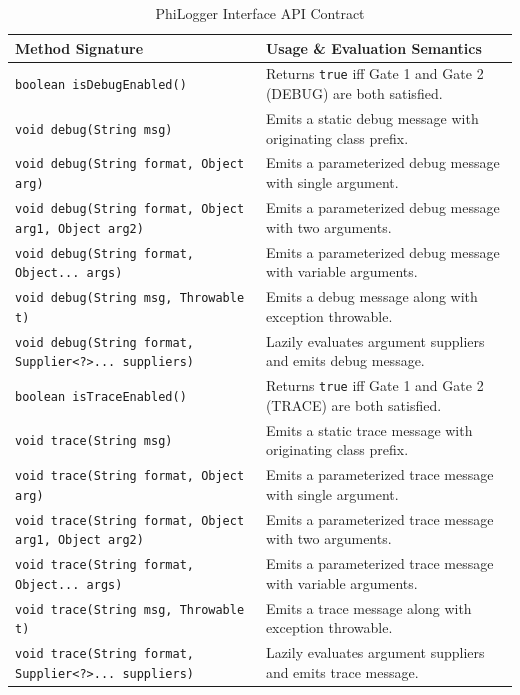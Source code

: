 \begin{table}[htbp]
\centering
\small
\begin{tabularx}{\textwidth}{l X}
\toprule
\textbf{Method Signature} & \textbf{Usage \& Evaluation Semantics} \\
\midrule
\texttt{boolean isDebugEnabled()} & Returns \texttt{true} iff Gate 1 and Gate 2 (DEBUG) are both satisfied. \\
\texttt{void debug(String msg)} & Emits a static debug message with originating class prefix. \\
\texttt{void debug(String format, Object arg)} & Emits a parameterized debug message with single argument. \\
\texttt{void debug(String format, Object arg1, Object arg2)} & Emits a parameterized debug message with two arguments. \\
\texttt{void debug(String format, Object... args)} & Emits a parameterized debug message with variable arguments. \\
\texttt{void debug(String msg, Throwable t)} & Emits a debug message along with exception throwable. \\
\texttt{void debug(String format, Supplier<?>... suppliers)} & Lazily evaluates argument suppliers and emits debug message. \\
\addlinespace
\texttt{boolean isTraceEnabled()} & Returns \texttt{true} iff Gate 1 and Gate 2 (TRACE) are both satisfied. \\
\texttt{void trace(String msg)} & Emits a static trace message with originating class prefix. \\
\texttt{void trace(String format, Object arg)} & Emits a parameterized trace message with single argument. \\
\texttt{void trace(String format, Object arg1, Object arg2)} & Emits a parameterized trace message with two arguments. \\
\texttt{void trace(String format, Object... args)} & Emits a parameterized trace message with variable arguments. \\
\texttt{void trace(String msg, Throwable t)} & Emits a trace message along with exception throwable. \\
\texttt{void trace(String format, Supplier<?>... suppliers)} & Lazily evaluates argument suppliers and emits trace message. \\
\bottomrule
\end{tabularx}
\caption{PhiLogger Interface API Contract}
\label{tab:phi_logger_api_methods}
\end{table}


